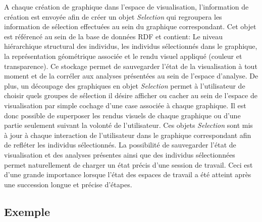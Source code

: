 A chaque création de graphique dans l'espace de visualisation, l'information de création est envoyée afin de créer un objet \textit{Selection} qui regroupera les information de sélection effectuées au sein du graphique correspondant. Cet objet est référencé au sein de la base de données RDF et contient: Le niveau hiérarchique structural des individus, les individus sélectionnés dans le graphique, la représentation géométrique associée et le rendu visuel appliqué (couleur et transparence). Ce stockage permet de sauvegarder l'état de la visualisation à tout moment et de la corréler aux analyses présentées au sein de l'espace d'analyse. De plus, un découpage des graphiques en objet \textit{Selection} permet à l'utilisateur de choisir quels groupes de sélection il désire afficher ou cacher au sein de l'espace de visualisation par simple cochage d'une case associée à chaque graphique. Il est donc possible de superposer les rendus visuels de chaque graphique ou d'une partie seulement suivant la volonté de l'utilisateur. Ces objets \textit{Selection} sont mis à jour à chaque interaction de l'utilisateur dans le graphique correspondant afin de refléter les individus sélectionnés. La possibilité de sauvegarder l'état de visualisation et des analyses présentes ainsi que des individus sélectionnées permet naturellement de charger un état précis d'une session de travail. Ceci est d'une grande importance lorsque l'état des espaces de travail a été atteint après une succession longue et précise d'étapes.


\subsection{Exemple}

